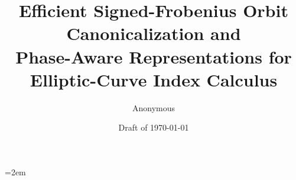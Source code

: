\documentclass[11pt,a4paper]{article}
\title{Efficient Signed-Frobenius Orbit Canonicalization and\\
       Phase-Aware Representations for\\
       Elliptic-Curve Index Calculus}
\author{Anonymous}
\date{Draft of \today}
\theoremstyle{definition}
\begin{document}
\maketitle
\emergencystretch=2em



\tableofcontents
\clearpage















\appendix

\end{document}
